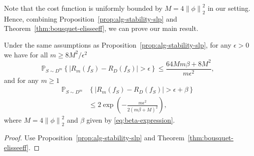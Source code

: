 \documentclass[letterpaper]{article} %
\begin{document}
Note that the cost function is uniformly bounded by $M=4 \left\| \phi \right\|_2^2$ in our setting. Hence, combining  Proposition~\ref{prop:alg-stability-slp} and Theorem~\ref{thm:bousquet-elisseeff}, we can prove our main result.
\begin{theorem}\label{Thm:Gen_Error_Soft}
  Under the same assumptions as Proposition~\ref{prop:alg-stability-slp}, for any $\epsilon>0$ we have for all $m\geq 8M^2/\epsilon^2$
  \begin{equation}
    \label{eq:fraction-bounds-1}
    \mathbb{P}_{S\sim D^m} \left\{ \left| R_m \left( f_S \right)-R_D \left( f_S \right) \right| > \epsilon\right\}\leq \frac{64 Mm\beta+8M^2}{m\epsilon^2},
  \end{equation}
  and for any $m\geq 1$
  \begin{equation}
    \label{eq:exponential-bounds-1}
    \begin{aligned}
    \mathbb{P}_{S\sim D^m}&\left\{ \left| R_m \left( f_S \right)-R_D \left( f_S \right) \right| > \epsilon+\beta\right\}\\
    &\leq 2\exp \left( -\frac{m\epsilon^2}{2 \left( m\beta+M \right)^2} \right),
    \end{aligned}
  \end{equation}
  where $M=4\left\| \phi \right\|_2^2$ and $\beta$ given by \eqref{eq:beta-expression}.
\end{theorem}

\begin{proof}
Use Proposition~\ref{prop:alg-stability-slp} and Theorem~\ref{thm:bousquet-elisseeff}.
\end{proof}

\end{document}
